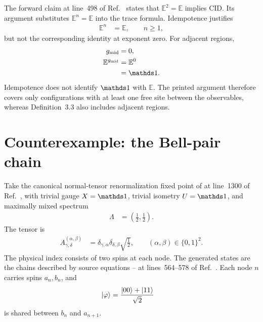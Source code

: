 \documentclass{article}
\begin{document}
The forward claim at line~498 of Ref.~\cite{Cirac2016MPDO_arXiv} states that
$\mathbb E^2=\mathbb E$ implies CID. Its argument substitutes
$\mathbb E^n=\mathbb E$ into the trace formula. Idempotence justifies
\begin{align}
    \mathbb E^n
        &=\mathbb E,
        \qquad n\geq 1,
    \label{eq:cpsv16_pure_zcl_adjacent_gap_cid_scope_positive_power_idempotence}
\end{align}
but not the corresponding identity at exponent zero. For adjacent regions,
\begin{align}
    g_{\mathrm{mid}}
        &=0,
    \label{eq:cpsv16_pure_zcl_adjacent_gap_cid_scope_adjacent_zero_gap}\\
    \mathbb E^{g_{\mathrm{mid}}}
        &=\mathbb E^0
    \label{eq:cpsv16_pure_zcl_adjacent_gap_cid_scope_zero_power_transfer}\\
        &=\Id.
    \label{eq:cpsv16_pure_zcl_adjacent_gap_cid_scope_zero_power_identity}
\end{align}
Idempotence does not identify $\Id$ with $\mathbb E$. The printed argument
therefore covers only configurations with at least one free site between the
observables, whereas Definition~3.3 also includes adjacent regions.

\section{Counterexample: the Bell-pair chain}

Take the canonical normal-tensor renormalization fixed point of
 at line~1300 of
Ref.~\cite{Cirac2016MPDO_arXiv}, with trivial gauge $X=\one$, trivial isometry
$U=\one$, and maximally mixed spectrum
\begin{align}
    \Lambda
        &=\left(\tfrac12,\tfrac12\right).
    \label{eq:cpsv16_pure_zcl_adjacent_gap_cid_scope_maximally_mixed_spectrum}
\end{align}
The tensor is
\begin{align}
    A^{(\alpha,\beta)}_{\gamma,\delta}
        &=\delta_{\gamma,\alpha}
          \delta_{\delta,\beta}\sqrt{\tfrac12},
        \qquad
        (\alpha,\beta)\in\{0,1\}^2.
    \label{eq:cpsv16_pure_zcl_adjacent_gap_cid_scope_bell_pair_tensor}
\end{align}
The physical index consists of two spins at each node. The generated states
are the chains described by source equations
-- at lines~564--578 of
Ref.~\cite{Cirac2016MPDO_arXiv}. Each node $n$ carries spins $a_n,b_n$, and
\begin{align}
    |\varphi\rangle
        &=\frac{|00\rangle+|11\rangle}{\sqrt2}
    \label{eq:cpsv16_pure_zcl_adjacent_gap_cid_scope_bell_state}
\end{align}
is shared between $b_n$ and $a_{n+1}$.
\end{document}

